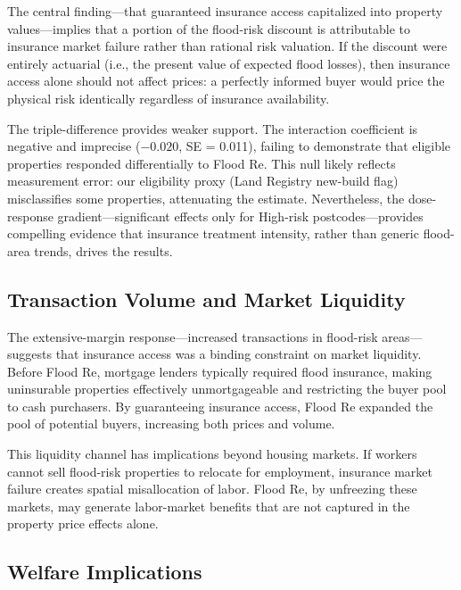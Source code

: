 \documentclass[12pt]{article}
\begin{document}
The central finding---that guaranteed insurance access capitalized into property values---implies that a portion of the flood-risk discount is attributable to insurance market failure rather than rational risk valuation. If the discount were entirely actuarial (i.e., the present value of expected flood losses), then insurance access alone should not affect prices: a perfectly informed buyer would price the physical risk identically regardless of insurance availability.

The triple-difference provides weaker support. The interaction coefficient is negative and imprecise ($-0.020$, SE = 0.011), failing to demonstrate that eligible properties responded differentially to Flood Re. This null likely reflects measurement error: our eligibility proxy (Land Registry new-build flag) misclassifies some properties, attenuating the estimate. Nevertheless, the dose-response gradient---significant effects only for High-risk postcodes---provides compelling evidence that insurance treatment intensity, rather than generic flood-area trends, drives the results.

\subsection{Transaction Volume and Market Liquidity}

The extensive-margin response---increased transactions in flood-risk areas---suggests that insurance access was a binding constraint on market liquidity. Before Flood Re, mortgage lenders typically required flood insurance, making uninsurable properties effectively unmortgageable and restricting the buyer pool to cash purchasers. By guaranteeing insurance access, Flood Re expanded the pool of potential buyers, increasing both prices and volume.

This liquidity channel has implications beyond housing markets. If workers cannot sell flood-risk properties to relocate for employment, insurance market failure creates spatial misallocation of labor. Flood Re, by unfreezing these markets, may generate labor-market benefits that are not captured in the property price effects alone.

\subsection{Welfare Implications}
\end{document}
